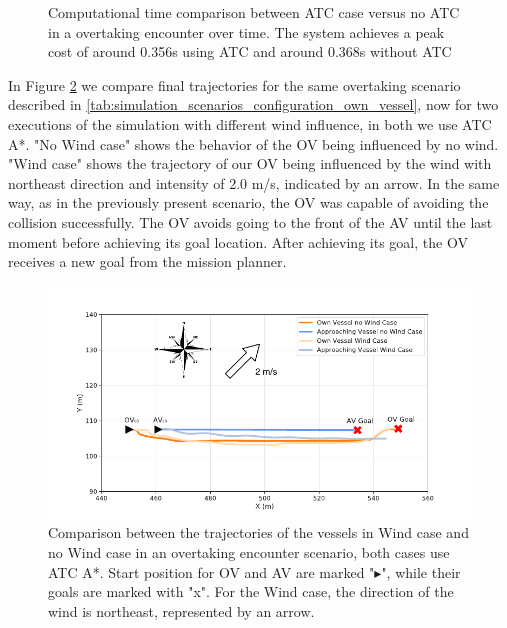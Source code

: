         \begin{figure}
            \centering
                
                \caption{Computational time comparison between \ac{ATC} case versus no \ac{ATC} in a overtaking encounter over time. The system achieves a peak cost of around 0.356s using \ac{ATC} and around 0.368s without \ac{ATC}}
                \label{fig:plot_ov_w_vs_wo_CT}
        \end{figure}
        
        
        In Figure \ref{fig:plot_ov_w_vs_wind} we compare final trajectories for the same overtaking scenario described in \ref{tab:simulation_scenarios_configuration_own_vessel}, now for two executions of the simulation with different wind influence, in both we use \ac{ATC} A*. "No Wind case" shows the behavior of the \ac{OV} being influenced by no wind. "Wind case" shows the trajectory of our \ac{OV} being influenced by the wind with northeast direction and intensity of 2.0 m/s, indicated by an arrow. In the same way, as in the previously present scenario, the \ac{OV} was capable of avoiding the collision successfully.  The \ac{OV} avoids going to the front of the \ac{AV} until the last moment before achieving its goal location. After achieving its goal, the \ac{OV} receives a new goal from the mission planner.
        
        \begin{figure}[H]
            \centering
            \includegraphics[width=\textwidth]{figs/Chap5/plot_ov_w_vs_wind.pdf}
            \caption{Comparison between the trajectories of the vessels in Wind case and no Wind case in an overtaking encounter scenario, both cases use \ac{ATC} A*. Start position for \ac{OV} and \ac{AV} are marked "$\blacktriangleright$", while their goals are marked with "x". For the Wind case, the direction of the wind is northeast, represented by an arrow.}
            \label{fig:plot_ov_w_vs_wind}
        \end{figure}

